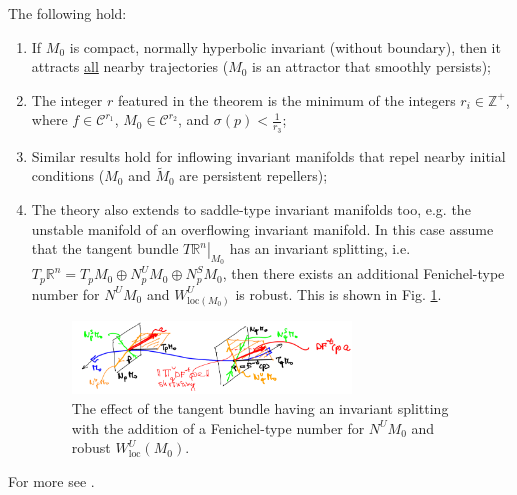 \begin{remark}[]
	The following hold:
	\begin{enumerate}
		\item If $M_0$ is compact, normally hyperbolic invariant (without boundary), then it attracts \underline{all} nearby trajectories ($M_0$ is an attractor that smoothly persists);
		\item The integer $r$ featured in the theorem is the minimum of the integers $r_i\in \mathbb{Z}^{+}$, where $f \in \mathcal{C}^{r_1}$, $M_0 \in \mathcal{C}^{r_2}$, and $\sigma(p) < \frac{1}{r_3}$;
		\item Similar results hold for inflowing invariant manifolds that repel nearby initial conditions ($M_0$ and $\tilde{M}_{0}$ are persistent repellers);
		\item The theory also extends to saddle-type invariant manifolds too, e.g. the unstable manifold of an overflowing invariant manifold. In this case assume that the tangent bundle $\left.T\mathbb{R}^{n}\right|_{M_0}$ has an invariant splitting, i.e. $T_{p}\mathbb{R}^{n} = T_pM_0 \oplus N_{p}^{U}M_0 \oplus N_{p}^{S}M_0$, then there exists an additional Fenichel-type number for $N^{U}M_0$ and $W^{U}_{ \textrm{loc} (M_0)}$ is robust. This is shown in Fig. \ref{fig:fenichel_thm_rmks}.
		\begin{figure}[h!]
			\centering
			\includegraphics[width=0.7\textwidth]{figures/ch9/16fenichel_thm_rmks.png}
			\caption{The effect of the tangent bundle having an invariant splitting with the addition of a Fenichel-type number for $N^{U}M_0$ and robust $W^{U}_{ \textrm{loc} }(M_0)$.}
			\label{fig:fenichel_thm_rmks}
		\end{figure}
	\end{enumerate}
\end{remark}
For more see \cite{Wiggins1994}.

